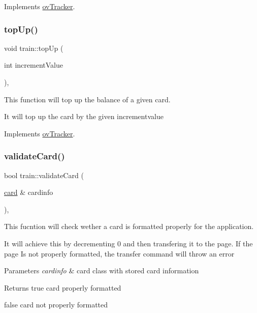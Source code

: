Implements \hyperlink{classovTracker_a776f469f9db184664e4f4425cca2df32}{ov\+Tracker}.

\mbox{\label{classtrain_a1bb8ac7f3f0bf3bfe61cf479abfe4cbb}} 
\subsubsection{\texorpdfstring{top\+Up()}{topUp()}}
{\footnotesize\ttfamily void train\+::top\+Up (\begin{DoxyParamCaption}\item[{int}]{increment\+Value }\end{DoxyParamCaption})\hspace{0.3cm}{\ttfamily [override]}, {\ttfamily [virtual]}}



This function will top up the balance of a given card. 

It will top up the card by the given incrementvalue 

Implements \hyperlink{classovTracker_a9611f8fe5ed1937262ebcd89bd7ee617}{ov\+Tracker}.

\mbox{\label{classtrain_aa484ea80f6754481e8c566da13c72f82}} 
\subsubsection{\texorpdfstring{validate\+Card()}{validateCard()}}
{\footnotesize\ttfamily bool train\+::validate\+Card (\begin{DoxyParamCaption}\item[{\hyperlink{classcard}{card} \&}]{cardinfo }\end{DoxyParamCaption})\hspace{0.3cm}{\ttfamily [override]}, {\ttfamily [virtual]}}



This fucntion will check wether a card is formatted properly for the application. 

It will achieve this by decrementing 0 and then transfering it to the page. If the page Is not properly formatted, the transfer command will throw an error 
\begin{DoxyParams}{Parameters}
{\em cardinfo} & card class with stored card information \\
\hline
\end{DoxyParams}
\begin{DoxyReturn}{Returns}
true card properly formatted 

false card not properly formatted 
\end{DoxyReturn}


